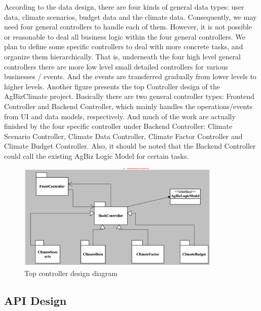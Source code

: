 \documentclass[onecolumn, draftclsnofoot,10pt, compsoc]{article}
\begin{document}
		According to the data design, there are four kinds of general data types: user data, climate scenarios, budget data and the climate data. Consequently, we may need four general controllers to handle each of them. However, it is not possible or reasonable to deal all business logic within the four general controllers. We plan to define some specific controllers to deal with more concrete tasks, and organize them hierarchically. That is, underneath the four high level general controllers there are more low level small detailed controllers for various businesses / events. And the events are transferred gradually from lower levels to higher levels. Another figure presents the top Controller design of the AgBizClimate project. Basically there are two general controller types: Frontend Controller and Backend Controller, which mainly handles the operations/events from UI and data models, respectively. And much of the work are actually finished by the four specific controller under Backend Controller: Climate Scenario Controller, Climate Data Controller, Climate Factor Controller and Climate Budget Controller. Also, it should be noted that the Backend Controller could call the existing AgBiz Logic Model for certain tasks.\\

	\begin{figure}[htb]
		\begin{center}
			\includegraphics[width=275pt]{UMLDiagrams/TopController.jpeg}
		\end{center}
		\caption{Top controller design diagram}
		\label{fig:TOPCon}
	\end{figure}

	\subsection{API Design}
\end{document}
